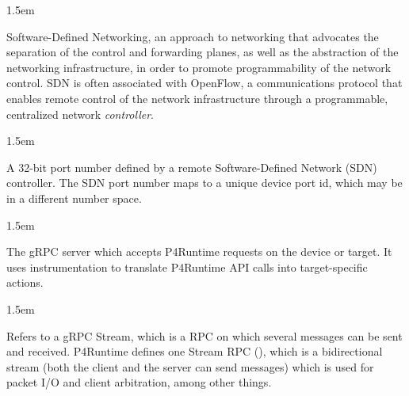 \documentclass[11pt]{article}
\begin{document}
{\begin{mddefinitions}
\begin{mdbmarginx}{}{}{}{1.5em}%
\begin{mddefdata}%
Software-Defined Networking, an approach to networking that advocates the
separation of the control and forwarding planes, as well as the abstraction
of the networking infrastructure, in order to promote programmability of the
network control. SDN is often associated with OpenFlow, a communications
protocol that enables remote control of the network infrastructure through a
programmable, centralized network \emph{controller}.
\end{mddefdata}%
\end{mdbmarginx}%


\begin{mdbmarginx}{}{}{}{1.5em}%
\begin{mddefdata}%
A 32-bit port number defined by a remote Software-Defined Network (SDN)
controller. The SDN port number maps to a unique device port id, which may
be in a different number space.
\end{mddefdata}%
\end{mdbmarginx}%


\begin{mdbmarginx}{}{}{}{1.5em}%
\begin{mddefdata}%
The gRPC server which accepts P4Runtime requests on the device or target. It
uses instrumentation to translate P4Runtime API calls into target-specific
actions.
\end{mddefdata}%
\end{mdbmarginx}%


\begin{mdbmarginx}{}{}{}{1.5em}%
\begin{mddefdata}%
Refers to a gRPC Stream, which is a RPC on which several messages can be
sent and received. P4Runtime defines one Stream RPC (), which
is a bidirectional stream (both the client and the server can send messages)
which is used for packet I/O and client arbitration, among other things.
\end{mddefdata}%
\end{mdbmarginx}%


\end{mddefinitions}}
\end{document}
